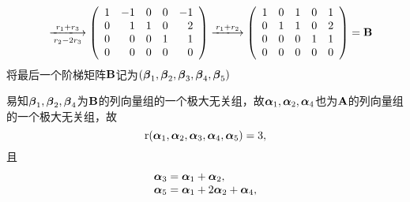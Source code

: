 \begin{frame}\ft{\subsecname}
  \begin{scriptsize}
    $$
    \begin{array}{rl}
      & \xlongrightarrow[r_2 -2 r_3]{r_1+r_3}
    \left(
    \begin{array}{rrrrr}
      1&-1&0&0&-1\\
      0&1&1&0&2\\
      0&0&0&1&1\\
      0&0&0&0&0
    \end{array}
    \right) \xlongrightarrow[]{r_1+r_2}
    \left(
    \begin{array}{rrrrr}
      1&0&1&0&1\\
      0&1&1&0&2\\
      0&0&0&1&1\\
      0&0&0&0&0
    \end{array}
    \right) = \B
    \end{array}
    $$
    将最后一个阶梯矩阵$\mathbf{B}$记为$(\boldsymbol{\beta}_1,\boldsymbol{\beta}_2,\boldsymbol{\beta}_3,\boldsymbol{\beta}_4,\boldsymbol{\beta}_5)$
    \pause 
    \vspace{0.1in}

    易知$\boldsymbol{\beta}_1,\boldsymbol{\beta}_2,\boldsymbol{\beta}_4$为$\mathbf{B}$的列向量组的一个极大无关组，故$\boldsymbol{\alpha}_1,\boldsymbol{\alpha}_2,\boldsymbol{\alpha}_4$也为$\mathbf{A}$的列向量组的一个极大无关组，故
    $$
    \mathrm{r}(\boldsymbol{\alpha}_1,\boldsymbol{\alpha}_2,\boldsymbol{\alpha}_3,\boldsymbol{\alpha}_4,\boldsymbol{\alpha}_5)=3,
    $$
    且
    $$
    \begin{array}{l}
      \boldsymbol{\alpha}_3=\boldsymbol{\alpha}_1+\boldsymbol{\alpha}_2,\\
      \boldsymbol{\alpha}_5=\boldsymbol{\alpha}_1+2\boldsymbol{\alpha}_2+\boldsymbol{\alpha}_4,\\
    \end{array}
    $$
    
  \end{scriptsize}
\end{frame}




